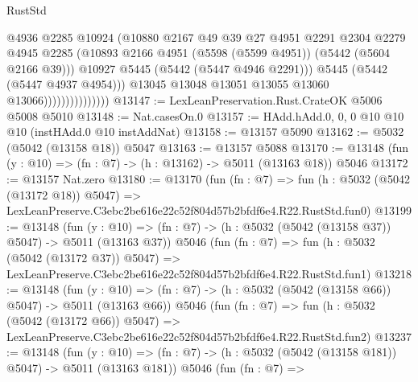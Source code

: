 \begin{lexlean}{RustStd}
\begin{coremodule}
                                    @4936
                                    @2285
                                    @10924
                                    (@10880
                                      @2167
                                      @49
                                      @39
                                      @27
                                      @4951
                                      @2291
                                      @2304
                                      @2279
                                      @4945
                                      @2285
                                      (@10893
                                        @2166
                                        @4951
                                        (@5598 (@5599 @4951))
                                        (@5442 (@5604 @2166 @39)))
                                      @10927
                                      @5445
                                      (@5442 (@5447 @4946 @2291)))
                                    @5445
                                    (@5442 (@5447 @4937 @4954)))
                                  @13045
                                  @13048
                                  @13051
                                  @13055
                                  @13060
                                  @13066)))))))))))))))
@13147 := LexLeanPreservation.Rust.CrateOK @5006 @5008 @5010
@13148 := Nat.casesOn.{0}
@13157 := HAdd.hAdd.{0, 0, 0} @10 @10 @10 (instHAdd.{0} @10 instAddNat)
@13158 := @13157 @5090
@13162 := @5032 (@5042 (@13158 @18)) @5047
@13163 := @13157 @5088
@13170 := @13148 (fun (y : @10) => (fn : @7) -> (h : @13162) -> @5011 (@13163 @18)) @5046
@13172 := @13157 Nat.zero
@13180 := @13170
    (fun (fn : @7) =>
    fun (h : @5032 (@5042 (@13172 @18)) @5047) =>
    LexLeanPreserve.C3ebc2be616e22c52f804d57b2bfdf6e4.R22.RustStd.fun0)
@13199 := @13148
    (fun (y : @10) => (fn : @7) -> (h : @5032 (@5042 (@13158 @37)) @5047) -> @5011 (@13163 @37))
    @5046
    (fun (fn : @7) =>
    fun (h : @5032 (@5042 (@13172 @37)) @5047) =>
    LexLeanPreserve.C3ebc2be616e22c52f804d57b2bfdf6e4.R22.RustStd.fun1)
@13218 := @13148
    (fun (y : @10) => (fn : @7) -> (h : @5032 (@5042 (@13158 @66)) @5047) -> @5011 (@13163 @66))
    @5046
    (fun (fn : @7) =>
    fun (h : @5032 (@5042 (@13172 @66)) @5047) =>
    LexLeanPreserve.C3ebc2be616e22c52f804d57b2bfdf6e4.R22.RustStd.fun2)
@13237 := @13148
    (fun (y : @10) => (fn : @7) -> (h : @5032 (@5042 (@13158 @181)) @5047) -> @5011 (@13163 @181))
    @5046
    (fun (fn : @7) =>

\end{coremodule}
\end{lexlean}
